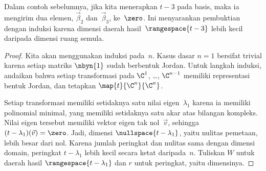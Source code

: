 Dalam contoh sebelumnya, jika kita menerapkan
$t-3$ pada basis, maka ia mengirim dua elemen,
$\vec{\beta}_2$ dan~$\vec{\beta}_3$, ke~$\zero$.
Ini menyarankan pembuktian dengan induksi
karena dimensi daerah hasil~$\rangespace{t-3}$
lebih kecil daripada dimensi ruang semula.

\begin{proof}
%
Kita akan menggunakan induksi pada~$n$.
Kasus dasar $n=1$ bersifat trivial karena setiap matriks $\nbyn{1}$ sudah berbentuk Jordan.
Untuk langkah induksi, andaikan bahwa
setiap transformasi pada $\C^1$, \ldots, $\C^{n-1}$ memiliki representasi
bentuk Jordan,
dan tetapkan $\map{t}{\C^n}{\C^n}$.

Setiap transformasi memiliki setidaknya satu nilai eigen~$\lambda_1$ karena
ia memiliki polinomial minimal, yang
memiliki setidaknya satu akar atas bilangan kompleks.
Nilai eigen tersebut memiliki vektor eigen
tak nol~$\vec{v}$, sehingga $(t-\lambda_1)(\vec{v})=\zero$.
Jadi, dimensi $\nullspace{t-\lambda_1}$, yaitu nulitas pemetaan,
lebih besar dari nol.
Karena jumlah peringkat dan nulitas sama dengan dimensi domain,
peringkat $t-\lambda_1$
lebih kecil secara ketat daripada~$n$.
Tuliskan $W$ untuk daerah hasil $\rangespace{t-\lambda_1}$ dan
$r$ untuk peringkat, yaitu dimensinya.


\end{proof}
